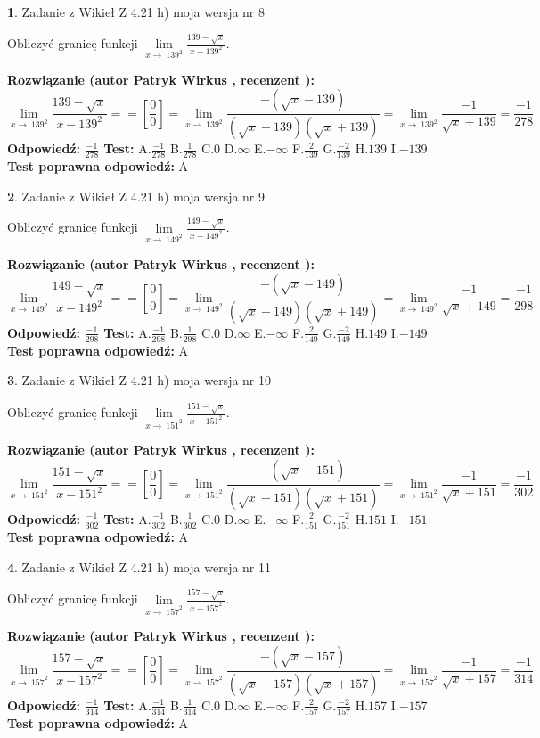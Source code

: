 \documentclass[12pt, a4paper]{article}
\theoremstyle{definition} %
\newtheorem{zad}{}
\newcommand{\zadStart}[1]{\begin{zad}#1\newline}
\newcommand{\zadStop}{\end{zad}}
\newcommand{\rozwStart}[2]{\noindent \textbf{Rozwiązanie (autor #1 , recenzent #2): }\newline}
\newcommand{\rozwStop}{\newline}
\newcommand{\odpStart}{\noindent \textbf{Odpowiedź:}\newline}
\newcommand{\odpStop}{\newline}
\newcommand{\testStart}{\noindent \textbf{Test:}\newline}
\newcommand{\testStop}{\newline}
\newcommand{\kluczStart}{\noindent \textbf{Test poprawna odpowiedź:}\newline}
\newcommand{\kluczStop}{\newline}
\begin{document}
\zadStart{Zadanie z Wikieł Z 4.21 h) moja wersja nr 8}

Obliczyć granicę funkcji $\lim\limits_{x\to\ 139^{2}}\frac{139-\sqrt{x}}{x-139^{2}}$.
\zadStop
\rozwStart{Patryk Wirkus}{}
$$\lim\limits_{x\to\ 139^{2}}\frac{139-\sqrt{x}}{x-139^{2}} = = [\frac{0}{0}] = \lim\limits_{x\to\ 139^{2}}\frac{-(\sqrt{x}-139)}{(\sqrt{x}-139)(\sqrt{x}+139)} = \lim\limits_{x\to\ 139^{2}}\frac{-1}{\sqrt{x}+139} = \frac{-1}{278}$$
\rozwStop
\odpStart
$\frac{-1}{278}$
\odpStop
\testStart
A.$\frac{-1}{278}$ B.$\frac{1}{278}$ C.$0$ D.$\infty$ E.$-\infty$
F.$\frac{2}{139}$ G.$\frac{-2}{139}$
H.$139$
I.$-139$
\testStop
\kluczStart
A
\kluczStop



\zadStart{Zadanie z Wikieł Z 4.21 h) moja wersja nr 9}

Obliczyć granicę funkcji $\lim\limits_{x\to\ 149^{2}}\frac{149-\sqrt{x}}{x-149^{2}}$.
\zadStop
\rozwStart{Patryk Wirkus}{}
$$\lim\limits_{x\to\ 149^{2}}\frac{149-\sqrt{x}}{x-149^{2}} = = [\frac{0}{0}] = \lim\limits_{x\to\ 149^{2}}\frac{-(\sqrt{x}-149)}{(\sqrt{x}-149)(\sqrt{x}+149)} = \lim\limits_{x\to\ 149^{2}}\frac{-1}{\sqrt{x}+149} = \frac{-1}{298}$$
\rozwStop
\odpStart
$\frac{-1}{298}$
\odpStop
\testStart
A.$\frac{-1}{298}$ B.$\frac{1}{298}$ C.$0$ D.$\infty$ E.$-\infty$
F.$\frac{2}{149}$ G.$\frac{-2}{149}$
H.$149$
I.$-149$
\testStop
\kluczStart
A
\kluczStop



\zadStart{Zadanie z Wikieł Z 4.21 h) moja wersja nr 10}

Obliczyć granicę funkcji $\lim\limits_{x\to\ 151^{2}}\frac{151-\sqrt{x}}{x-151^{2}}$.
\zadStop
\rozwStart{Patryk Wirkus}{}
$$\lim\limits_{x\to\ 151^{2}}\frac{151-\sqrt{x}}{x-151^{2}} = = [\frac{0}{0}] = \lim\limits_{x\to\ 151^{2}}\frac{-(\sqrt{x}-151)}{(\sqrt{x}-151)(\sqrt{x}+151)} = \lim\limits_{x\to\ 151^{2}}\frac{-1}{\sqrt{x}+151} = \frac{-1}{302}$$
\rozwStop
\odpStart
$\frac{-1}{302}$
\odpStop
\testStart
A.$\frac{-1}{302}$ B.$\frac{1}{302}$ C.$0$ D.$\infty$ E.$-\infty$
F.$\frac{2}{151}$ G.$\frac{-2}{151}$
H.$151$
I.$-151$
\testStop
\kluczStart
A
\kluczStop



\zadStart{Zadanie z Wikieł Z 4.21 h) moja wersja nr 11}

Obliczyć granicę funkcji $\lim\limits_{x\to\ 157^{2}}\frac{157-\sqrt{x}}{x-157^{2}}$.
\zadStop
\rozwStart{Patryk Wirkus}{}
$$\lim\limits_{x\to\ 157^{2}}\frac{157-\sqrt{x}}{x-157^{2}} = = [\frac{0}{0}] = \lim\limits_{x\to\ 157^{2}}\frac{-(\sqrt{x}-157)}{(\sqrt{x}-157)(\sqrt{x}+157)} = \lim\limits_{x\to\ 157^{2}}\frac{-1}{\sqrt{x}+157} = \frac{-1}{314}$$
\rozwStop
\odpStart
$\frac{-1}{314}$
\odpStop
\testStart
A.$\frac{-1}{314}$ B.$\frac{1}{314}$ C.$0$ D.$\infty$ E.$-\infty$
F.$\frac{2}{157}$ G.$\frac{-2}{157}$
H.$157$
I.$-157$
\testStop
\kluczStart
A
\kluczStop
\end{document}
